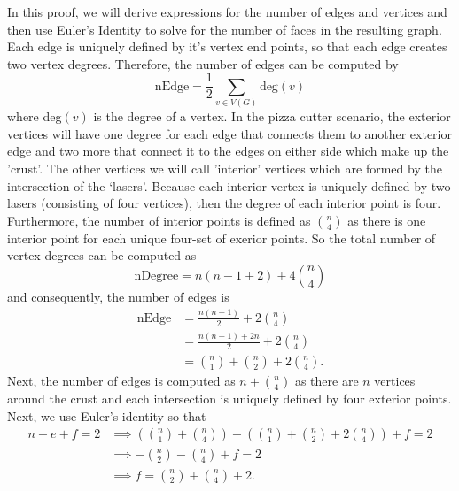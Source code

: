 \documentclass{article}
\begin{document}
In this proof, we will derive expressions for the number of edges and vertices and then use Euler's Identity to solve for the number of faces in the resulting graph. \\
Each edge is uniquely defined by it's vertex end points, so that each edge creates two vertex degrees. Therefore, the number of edges can be computed by
\begin{equation*}
	\text{nEdge} = \frac{1}{2}\sum_{v \in V(G)} \text{deg}(v)
\end{equation*}
where deg$(v)$ is the degree of a vertex. In the pizza cutter scenario, the exterior vertices will have one degree for each edge that connects them to another exterior edge and two more that connect it to the edges on either side which make up the 'crust'. The other vertices we will call 'interior' vertices which are formed by the intersection of the `lasers'. Because each interior vertex is uniquely defined by two lasers (consisting of four vertices), then the degree of each interior point is four. Furthermore, the number of interior points is defined as ${n \choose 4}$ as there is one interior point for each unique four-set of exerior points. So the total number of vertex degrees can be computed as
\begin{equation*}
	\text{nDegree} = n(n - 1 + 2) + 4{n \choose 4}
\end{equation*}
and consequently, the number of edges is 
\begin{equation*}\begin{aligned}
	\text{nEdge} &= \frac{n(n + 1)}{2} + 2{n\choose 4} \\
			     &= \frac{n(n - 1) + 2n}{2} + 2{n\choose 4} \\
				 &= {n \choose 1} + {n \choose 2} + 2 {n\choose 4}.
\end{aligned}\end{equation*}
Next, the number of edges is computed as $n + {n \choose 4}$ as there are $n$ vertices around the crust and each intersection is uniquely defined by four exterior points. Next, we use Euler's identity so that
\begin{equation*}\begin{aligned}
	n - e + f = 2 & \implies \left ({n \choose 1} + {n \choose 4} \right ) - \left ( {n \choose 1} + {n \choose 2} + 2{n\choose 4} \right) + f = 2 \\
				  & \implies -{n \choose 2} - {n \choose 4} + f = 2 \\
				  & \implies f = {n \choose 2} + {n \choose 4} + 2.
\end{aligned}\end{equation*}
\end{document}
